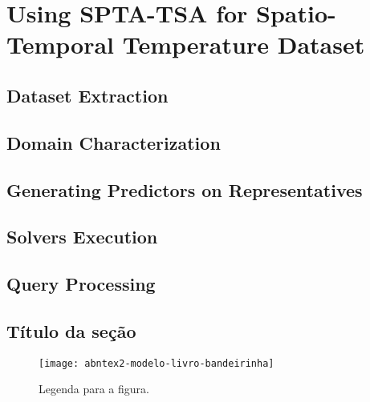 \chapter{Using SPTA-TSA for Spatio-Temporal Temperature Dataset}
\label{apendiceA}

\section{Dataset Extraction}




\section{Domain Characterization}

\section{Generating Predictors on Representatives}

\section{Solvers Execution}

\section{Query Processing}

\section{Título da seção}

\begin{figure}
    \begin{center}
        \texttt{[image: abntex2-modelo-livro-bandeirinha]}
        \caption{Legenda para a figura.}
        \label{rotulo1}
    \end{center}
\end{figure}